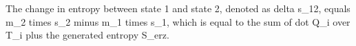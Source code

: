 The change in entropy between state 1 and state 2, denoted as delta s_12, equals m_2 times s_2 minus m_1 times s_1, which is equal to the sum of dot Q_i over T_i plus the generated entropy S_erz.